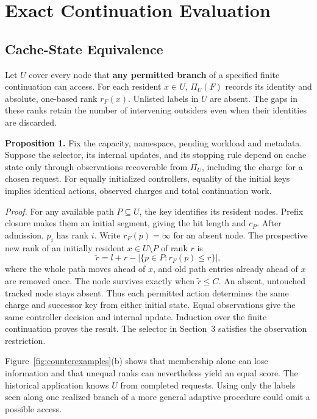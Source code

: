 \documentclass[11pt,letterpaper]{article}
\begin{document}
\section{Exact Continuation Evaluation}

\subsection{Cache-State Equivalence}

Let $U$ cover every node that \textbf{any permitted branch} of a specified finite continuation can access. For each resident $x\in U$, $\Pi_U(F)$ records its identity and absolute, one-based rank $r_F(x)$. Unlisted labels in $U$ are absent. The gaps in these ranks retain the number of intervening outsiders even when their identities are discarded.

\textbf{Proposition 1.} Fix the capacity, namespace, pending workload and metadata. Suppose the selector, its internal updates, and its stopping rule depend on cache state only through observations recoverable from $\Pi_U$, including the charge for a chosen request. For equally initialized controllers, equality of the initial keys implies identical actions, observed charges and total continuation work.

\emph{Proof.} For any available path $P\subseteq U$, the key identifies its resident nodes. Prefix closure makes them an initial segment, giving the hit length and $c_P$. After admission, $p_i$ has rank $i$. Write $r_F(p)=\infty$ for an absent node. The prospective new rank of an initially resident $x\in U\setminus P$ of rank $r$ is
\[
 \tilde r=l+r-|\{p\in P:r_F(p)\le r\}|,
 \tag{2}
\]
where the whole path moves ahead of $x$, and old path entries already ahead of $x$ are removed once. The node survives exactly when $\tilde r\le C$. An absent, untouched tracked node stays absent. Thus each permitted action determines the same charge and successor key from either initial state. Equal observations give the same controller decision and internal update. Induction over the finite continuation proves the result. The selector in Section~3 satisfies the observation restriction.

Figure~\ref{fig:counterexamples}(b) shows that membership alone can lose information and that unequal ranks can nevertheless yield an equal score. The historical application knows $U$ from completed requests. Using only the labels seen along one realized branch of a more general adaptive procedure could omit a possible access.
\end{document}
